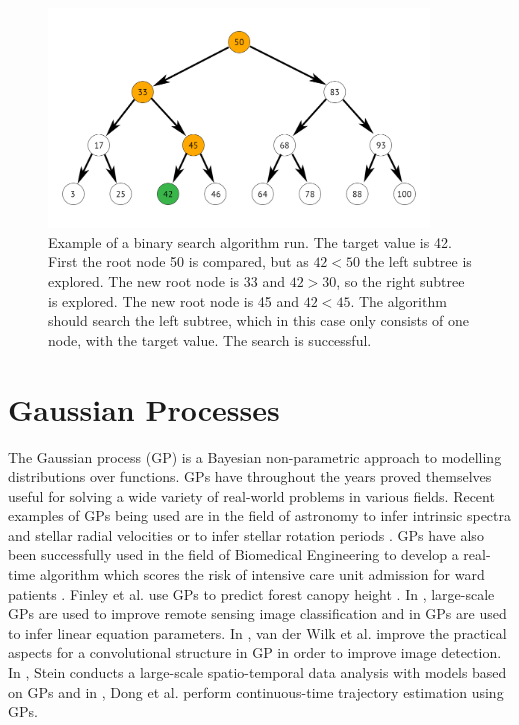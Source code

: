 \begin{figure}[t!]
    \centering
    \includegraphics[width=0.9\textwidth]{figures/binary_search_algorithm}
    \caption[Example of a binary search algorithm run]
    {\small Example of a binary search algorithm run.
    The target value is 42.
    First the root node 50 is compared, but as $42 < 50$ the left subtree is explored.
    The new root node is 33 and $42 > 30$, so the right subtree is explored.
    The new root node is 45 and $42 < 45$.
    The algorithm should search the left subtree, which in this case only consists of one node, with the target value.
    The search is successful.}
    \label{fig:binary-search-algorithm}
\end{figure}

\section{Gaussian Processes}
The Gaussian process \cite{Rasmussen2006} (GP) is a Bayesian non-parametric approach to modelling distributions over functions.
GPs have throughout the years proved themselves useful for solving a wide variety of real-world problems in various fields.
Recent examples of GPs being used are in the field of astronomy to infer intrinsic spectra and stellar radial velocities \cite{Czekala2017} or to infer stellar rotation periods \cite{Angus2017}.
GPs have also been successfully used in the field of Biomedical Engineering to develop a real-time algorithm which scores the risk of intensive care unit admission for ward patients \cite{Alaa2018}.
Finley et al. use GPs to predict forest canopy height \cite{Finley2017}.
In \cite{8082124}, large-scale GPs are used to improve remote sensing image classification and in \cite{Raissi2017} GPs are used to infer linear equation parameters.
In \cite{NIPS2017_6877}, van der Wilk et al. improve the practical aspects for a convolutional structure in GP in order to improve image detection.
In \cite{Stein2017}, Stein conducts a large-scale spatio-temporal data analysis with models based on GPs and in \cite{Dong2017}, Dong et al. perform continuous-time trajectory estimation using GPs.

